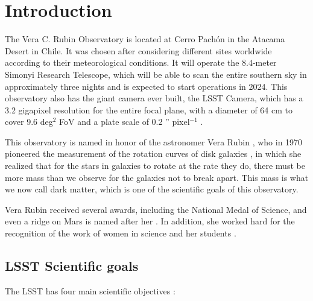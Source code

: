 \section{Introduction} \label{sec:intro}


The Vera C. Rubin Observatory is located at Cerro Pachón in the Atacama Desert in Chile. It was chosen after considering different sites worldwide according to their meteorological conditions. It will operate the 8.4-meter Simonyi Research Telescope, which will be able to scan the entire southern sky in approximately three nights and is expected to start operations in 2024. This observatory also has the giant camera ever built, the LSST Camera, which has a 3.2 gigapixel resolution for the entire focal plane, with a diameter of 64 cm to cover 9.6 deg$^2$ FoV and a plate scale of 0.2 '' pixel$^{-1}$ \citep{2009arXiv0912.0201L}.

\vspace{3mm}

This observatory is named in honor of the astronomer Vera Rubin  \citep{NSF_2020}, who in 1970 pioneered the measurement of the rotation curves of disk galaxies \citep{rubin2011interesting}, in which she realized that for the stars in galaxies to rotate at the rate they do, there must be more mass than we observe for the galaxies not to break apart. This mass is what we now call dark matter, which is one of the scientific goals of this observatory. 

\vspace{3mm}

Vera Rubin received several awards, including the National Medal of Science, and even a ridge on Mars is named after her \citep{koren_2020}. In addition, she worked hard for the recognition of the work of women in science and her students \citep{rubin2011interesting}. 


\subsection{LSST Scientific goals}

The LSST has four main scientific objectives \citep{2009arXiv0912.0201L, ivezic2019lsst}:

